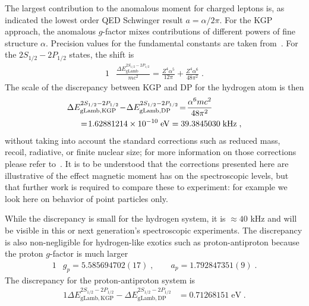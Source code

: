 The largest contribution to the anomalous moment for charged leptons is, as indicated the lowest order QED Schwinger result $a=\alpha/2\pi$. For the KGP approach, the anomalous $g$-factor mixes contributions of different powers of fine structure $\alpha$. Precision values for the fundamental constants are taken from~\cite{Tiesinga:2021myr}. For the $2S_{1/2}-2P_{1/2}$ states, the shift is
\begin{alignat}{1}
\label{lamb04} &\frac{\Delta E_{\mathrm{gLamb}}^{2S_{1/2}-2P_{1/2}}}{mc^{2}}=\frac{Z^{4}\alpha^{5}}{12\pi}+\frac{Z^{4}\alpha^{6}}{48\pi^{2}}\;.
\end{alignat}
The scale of the discrepancy between KGP and DP for the hydrogen atom is then
\begin{alignat}{1}
\label{lamb05} \Delta &E_{\mathrm{gLamb,KGP}}^{2S_{1/2}-2P_{1/2}}\!-\!\Delta E_{\mathrm{gLamb,DP}}^{2S_{1/2}-2P_{1/2}}\!=\!\frac{\alpha^{6}mc^{2}}{48\pi^{2}}\\ \notag&\;\;=\!1.62881214\times10^{-10}\;\mathrm{eV} =39.3845030\;\mathrm{kHz}\;,\end{alignat}
without taking into account the standard corrections such as reduced mass, recoil, radiative, or finite nuclear size; for more information on those corrections please refer to~\cite{Jentschura:1996zz,Eides:2000xc,Tiesinga:2021myr}. It is to be understood that the corrections presented here are illustrative of the effect magnetic moment has on the spectroscopic levels, but that further work is required to compare these to experiment: for example we look here on behavior of point particles only.

While the discrepancy is small for the hydrogen system, it is $\approx 40$ kHz and will be visible in this or next generation's spectroscopic experiments. The discrepancy is also non-negligible for hydrogen-like exotics such as proton-antiproton because the proton $g$-factor is much larger
\begin{alignat}{1}\label{gpaFULL}
&g_p=5.585694702(17)\;,\qquad a_p=1.792847351(9)\;. 
\end{alignat} 
The discrepancy for the proton-antiproton system is
\begin{alignat}{1}
\label{lamb06} \Delta E_{\mathrm{gLamb,KGP}}^{2S_{1/2}-2P_{1/2}}-\Delta E_{\mathrm{gLamb,DP}}^{2S_{1/2}-2P_{1/2}}&=0.71268151\;\mathrm{eV}\;.
\end{alignat} 

